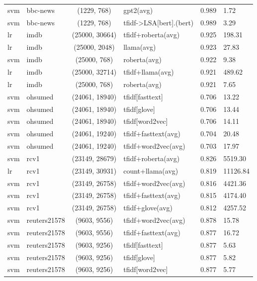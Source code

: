 \documentclass[final]{clv2025}
\begin{document}
\begin{table}[h!]
\begin{tabular}{@{}p{.7cm} p{1.8cm} c >{\raggedright\arraybackslash}p{5.8cm} r p{1.0cm}@{}}
svm & bbc-news & (1229, 768) & gpt2(avg) & 0.989 & 1.72 \\
svm & bbc-news & (1229, 768) & tfidf->LSA[bert].(bert) & 0.989 & 3.29 \\
\midrule
lr & imdb & (25000, 30664) & tfidf+roberta(avg) & 0.925 & 198.31 \\
lr & imdb & (25000, 2048) & llama(avg) & 0.923 & 27.83 \\
svm & imdb & (25000, 768) & roberta(avg) & 0.922 & 9.38 \\
lr & imdb & (25000, 32714) & tfidf+llama(avg) & 0.921 & 489.62 \\
lr & imdb & (25000, 768) & roberta(avg) & 0.921 & 7.65 \\
\midrule
svm & ohsumed & (24061, 18940) & tfidf[fasttext] & 0.706 & 13.22 \\
svm & ohsumed & (24061, 18940) & tfidf[glove] & 0.706 & 13.44 \\
svm & ohsumed & (24061, 18940) & tfidf[word2vec] & 0.706 & 14.11 \\
svm & ohsumed & (24061, 19240) & tfidf+fasttext(avg) & 0.704 & 20.48 \\
svm & ohsumed & (24061, 19240) & tfidf+word2vec(avg) & 0.703 & 17.97 \\
\midrule
svm & rcv1 & (23149, 28679) & tfidf+roberta(avg) & 0.826 & 5519.30 \\
lr & rcv1 & (23149, 30931) & count+llama(avg) & 0.819 & 11126.84 \\
svm & rcv1 & (23149, 26758) & tfidf+word2vec(avg) & 0.816 & 4421.36 \\
svm & rcv1 & (23149, 26758) & tfidf+fasttext(avg) & 0.815 & 4174.40 \\
svm & rcv1 & (23149, 26758) & tfidf+glove(avg) & 0.812 & 4257.52 \\
\midrule
svm & reuters21578 & (9603, 9556) & tfidf+word2vec(avg) & 0.878 & 15.78 \\
svm & reuters21578 & (9603, 9556) & tfidf+fasttext(avg) & 0.877 & 16.72 \\
svm & reuters21578 & (9603, 9256) & tfidf[fasttext] & 0.877 & 5.63 \\
svm & reuters21578 & (9603, 9256) & tfidf[glove] & 0.877 & 5.82 \\
svm & reuters21578 & (9603, 9256) & tfidf[word2vec] & 0.877 & 5.77 \\
\bottomrule
\end{tabular}
\end{table}
\end{document}
